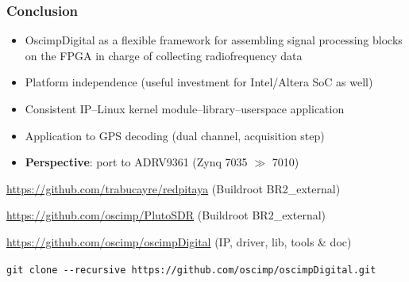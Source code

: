 \documentclass[compress,10pt]{beamer}
\begin{document}
\begin{frame}[fragile]\frametitle{Conclusion}

\begin{itemize}
\item OscimpDigital as a flexible framework for assembling signal processing
blocks on the FPGA in charge of collecting radiofrequency data
\item Platform independence (useful investment for Intel/Altera SoC as well)
\item Consistent IP--Linux kernel module--library--userspace application
\item Application to GPS decoding (dual channel, acquisition step)
\item {\bf Perspective}: port to ADRV9361 (Zynq 7035 $\gg$ 7010)
\end{itemize}

\vfill
{}

\vfill
{}

{\footnotesize
{\url{https://github.com/trabucayre/redpitaya}} (Buildroot BR2\_external)

{\url{https://github.com/oscimp/PlutoSDR}} (Buildroot BR2\_external)

{\url{https://github.com/oscimp/oscimpDigital}} (IP, driver, lib, tools \& doc)
}

\vfill
{}

{\footnotesize
{\verb!git clone --recursive https://github.com/oscimp/oscimpDigital.git!}
}
\end{frame}
\end{document}
